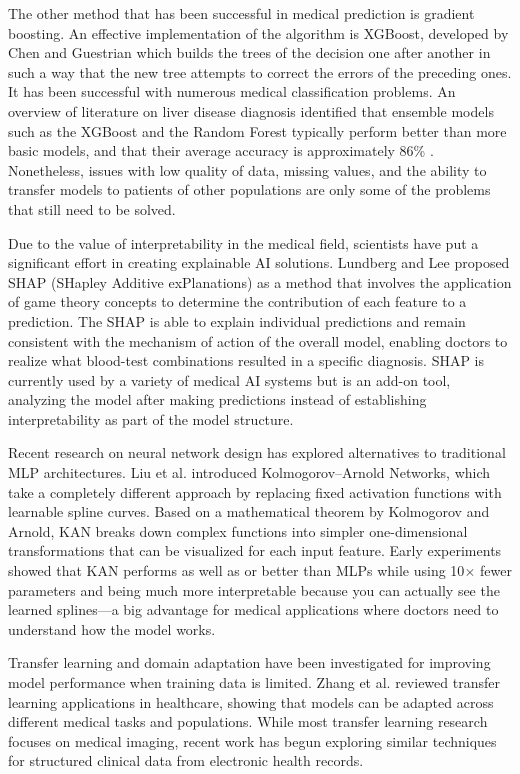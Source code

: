 \documentclass[conference]{IEEEtran}
\begin{document}
The other method that has been successful in medical prediction is gradient boosting. An effective implementation of the algorithm is XGBoost, developed by Chen and Guestrian \cite{chen2016} which builds the trees of the decision one after another in such a way that the new tree attempts to correct the errors of the preceding ones. It has been successful with numerous medical classification problems. An overview of literature on liver disease diagnosis identified that ensemble models such as the XGBoost and the Random Forest typically perform better than more basic models, and that their average accuracy is approximately 86\% \cite{sarker2021}. Nonetheless, issues with low quality of data, missing values, and the ability to transfer models to patients of other populations are only some of the problems that still need to be solved.


Due to the value of interpretability in the medical field, scientists have put a significant effort in creating explainable AI solutions. Lundberg and Lee \cite{lundberg2017} proposed SHAP (SHapley Additive exPlanations) as a method that involves the application of game theory concepts to determine the contribution of each feature to a prediction. The SHAP is able to explain individual predictions and remain consistent with the mechanism of action of the overall model, enabling doctors to realize what blood-test combinations resulted in a specific diagnosis. SHAP is currently used by a variety of medical AI systems but is an add-on tool, analyzing the model after making predictions instead of establishing interpretability as part of the model structure.

Recent research on neural network design has explored alternatives to traditional MLP architectures. Liu et al. \cite{liu2024} introduced Kolmogorov--Arnold Networks, which take a completely different approach by replacing fixed activation functions with learnable spline curves. Based on a mathematical theorem by Kolmogorov and Arnold, KAN breaks down complex functions into simpler one-dimensional transformations that can be visualized for each input feature. Early experiments showed that KAN performs as well as or better than MLPs while using 10$\times$ fewer parameters and being much more interpretable because you can actually see the learned splines—a big advantage for medical applications where doctors need to understand how the model works.

Transfer learning and domain adaptation have been investigated for improving model performance when training data is limited. Zhang et al. \cite{zhang2022} reviewed transfer learning applications in healthcare, showing that models can be adapted across different medical tasks and populations. While most transfer learning research focuses on medical imaging, recent work has begun exploring similar techniques for structured clinical data from electronic health records.
\end{document}
